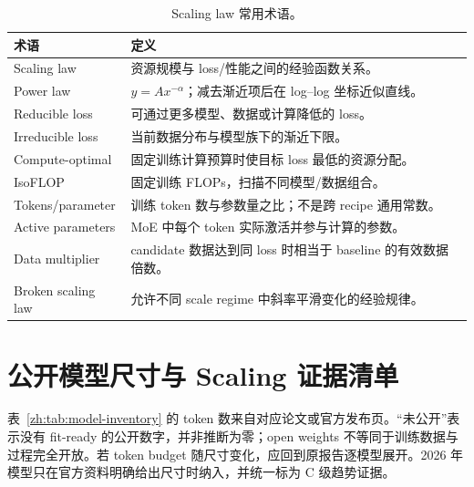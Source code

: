 \documentclass[UTF8,10pt,a4paper,fontset=none]{ctexart}
\begin{document}
\begin{table}[htbp]
\centering
\caption{Scaling law 常用术语。}\label{zh:tab:glossary}
\begin{tabularx}{\textwidth}{p{3.6cm}X}
\toprule
术语 & 定义 \\
\midrule
Scaling law & 资源规模与 loss/性能之间的经验函数关系。 \\
Power law & $y=A x^{-\alpha}$；减去渐近项后在 log--log 坐标近似直线。 \\
Reducible loss & 可通过更多模型、数据或计算降低的 loss。 \\
Irreducible loss & 当前数据分布与模型族下的渐近下限。 \\
Compute-optimal & 固定训练计算预算时使目标 loss 最低的资源分配。 \\
IsoFLOP & 固定训练 FLOPs，扫描不同模型/数据组合。 \\
Tokens/parameter & 训练 token 数与参数量之比；不是跨 recipe 通用常数。 \\
Active parameters & MoE 中每个 token 实际激活并参与计算的参数。 \\
Data multiplier & candidate 数据达到同 loss 时相当于 baseline 的有效数据倍数。 \\
Broken scaling law & 允许不同 scale regime 中斜率平滑变化的经验规律。 \\
\bottomrule
\end{tabularx}
\end{table}

\section{公开模型尺寸与 Scaling 证据清单}
\label{zh:app:model-inventory}

表~\ref{zh:tab:model-inventory} 的 token 数来自对应论文或官方发布页。“未公开”表示没有 fit-ready 的公开数字，并非推断为零；open weights 不等同于训练数据与过程完全开放。若 token budget 随尺寸变化，应回到原报告逐模型展开。2026 年模型只在官方资料明确给出尺寸时纳入，并统一标为 C 级趋势证据。
\end{document}
